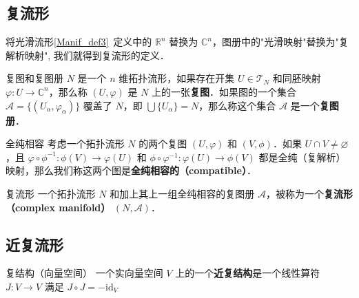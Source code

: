 

\subsection{复流形}

将光滑流形\autoref{Manif_def3}~定义中的 $\mathbb{R}^n$ 替换为 $\mathbb{C}^n$，图册中的"光滑映射"替换为"复解析映射", 我们就得到复流形的定义．

\begin{definition}{复图和复图册}
$N$ 是一个 $n$ 维拓扑流形，如果存在开集 $U \in \mathcal{T}_N$ 和同胚映射 $\varphi: U \rightarrow \mathbb{C}^n$，那么称 $(U,\varphi)$ 是 $N$ 上的一张\textbf{复图}．如果图的一个集合 $\mathcal{A}=\{(U_\alpha, \varphi_\alpha)\}$ 覆盖了 $N$，即 $\bigcup\{U_\alpha\}=N$，那么称这个集合 $\mathcal{A}$ 是一个\textbf{复图册}．
\end{definition}


\begin{definition}{全纯相容}
考虑一个拓扑流形 $N$ 的两个复图 $(U, \varphi)$ 和 $(V, \phi)$．如果 $U \cap V \neq \varnothing$，且 $\varphi \circ \phi^{-1}: \phi(V) \rightarrow \varphi(U)$ 和 $\phi \circ \varphi^{-1}: \varphi(U) \rightarrow \phi(V)$ 都是全纯（复解析）映射，那么我们称这两个图是\textbf{全纯相容的（compatible）}．
\end{definition}

\begin{definition}{复流形}
一个拓扑流形 $N$ 和加上其上一组全纯相容的复图册 $\mathcal{A}$，被称为一个\textbf{复流形（complex manifold）} $(N, \mathcal{A})$．
\end{definition}

\subsection{近复流形}

\begin{definition}{复结构（向量空间）}
一个实向量空间 $V$ 上的一个\textbf{近复结构}是一个线性算符 $J: V \to V$ 满足 $J \circ J = - \text{id}_V$
\end{definition}


